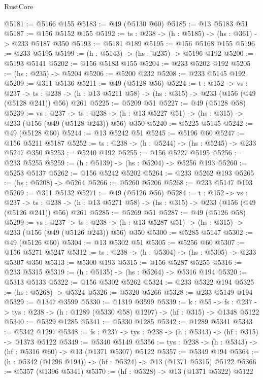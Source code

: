 \begin{lexlean}{RustCore}
\begin{coremodule}
@5181 := @5166 @155
@5183 := @49 (@5130 @60)
@5185 := @13 @5183 @51
@5187 := @156 @5152 @155
@5192 := {ts : @238} -> (h : @5185) -> (hs : @361) -> @233 @5187 @350
@5193 := @5181 @189
@5195 := @156 @5168 @155
@5196 := @233 @5195
@5199 := (h : @5143) -> (hs : @235) -> @5196 @192
@5200 := @5193 @5141
@5202 := @156 @5183 @155
@5204 := @233 @5202 @192
@5205 := (hs : @235) -> @5204
@5206 := @5200 @232
@5208 := @233 @5145 @192
@5209 := @311 @5136
@5211 := @49 (@5128 @56)
@5224 := {t : @152} ->
  {vs : @237} ->
  {ts : @238} -> (h : @13 @5211 @58) -> (hs : @315) -> @233 (@156 (@49 (@5128 @241)) @56) @261
@5225 := @5209 @51
@5227 := @49 (@5128 @58)
@5239 := {vs : @237} ->
  {ts : @238} -> (h : @13 @5227 @51) -> (hs : @315) -> @233 (@156 (@49 (@5128 @243)) @56) @350
@5240 := @5225 @5145
@5242 := @49 (@5128 @60)
@5244 := @13 @5242 @51
@5245 := @5196 @60
@5247 := @156 @5211 @5187
@5252 := {ts : @238} -> (h : @5244) -> (hs : @5245) -> @233 @5247 @350
@5253 := @5240 @192
@5255 := @156 @5227 @5195
@5256 := @233 @5255
@5259 := (h : @5139) -> (hs : @5204) -> @5256 @193
@5260 := @5253 @5137
@5262 := @156 @5242 @5202
@5264 := @233 @5262 @193
@5265 := (hs : @5208) -> @5264
@5266 := @5260 @5206
@5268 := @233 @5147 @193
@5269 := @311 @5132
@5271 := @49 (@5126 @56)
@5284 := {t : @152} ->
  {vs : @237} ->
  {ts : @238} -> (h : @13 @5271 @58) -> (hs : @315) -> @233 (@156 (@49 (@5126 @241)) @56) @261
@5285 := @5269 @51
@5287 := @49 (@5126 @58)
@5299 := {vs : @237} ->
  {ts : @238} -> (h : @13 @5287 @51) -> (hs : @315) -> @233 (@156 (@49 (@5126 @243)) @56) @350
@5300 := @5285 @5147
@5302 := @49 (@5126 @60)
@5304 := @13 @5302 @51
@5305 := @5256 @60
@5307 := @156 @5271 @5247
@5312 := {ts : @238} -> (h : @5304) -> (hs : @5305) -> @233 @5307 @350
@5313 := @5300 @193
@5315 := @156 @5287 @5255
@5316 := @233 @5315
@5319 := (h : @5135) -> (hs : @5264) -> @5316 @194
@5320 := @5313 @5133
@5322 := @156 @5302 @5262
@5324 := @233 @5322 @194
@5325 := (hs : @5268) -> @5324
@5326 := @5320 @5266
@5328 := @233 @5149 @194
@5329 := @1347 @3599
@5330 := @1319 @3599
@5339 := {k : @55} ->
  {fs : @237} -> {tys : @238} -> (h : @1289 (@5330 @58) @1297) -> (hf : @315) -> @1348 @5122
@5340 := @5329 @1285
@5341 := @5330 @1285
@5342 := @1289 @5341
@5343 := @5342 @1297
@5348 := {fs : @237} -> {tys : @238} -> (h : @5343) -> (hf : @315) -> @1373 @5122
@5349 := @5340 @5149
@5356 := {tys : @238} -> (h : @5343) -> (hf : @5316 @60) -> @13 (@1371 @5307) @5122
@5357 := @5349 @194
@5364 := (h : @5342 (@1296 @194)) -> (hf : @5324) -> @13 (@1371 @5315) @5122
@5366 := @5357 (@1396 @5341)
@5370 := (hf : @5328) -> @13 (@1371 @5322) @5122

\end{coremodule}
\end{lexlean}
